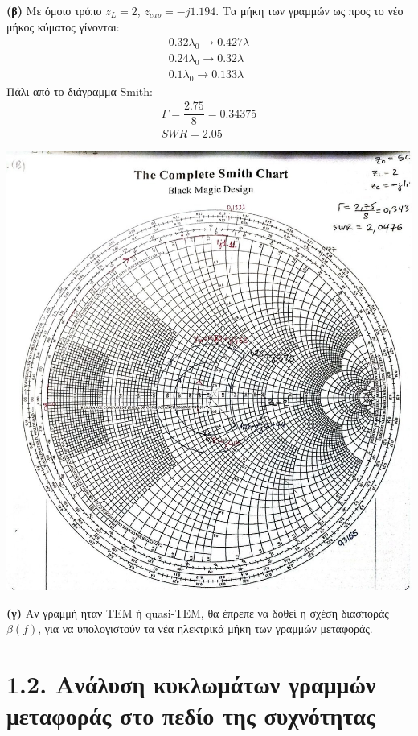 \documentclass[12pt]{article}
\begin{document}
\newpage
\textbf{(β)} Με όμοιο τρόπο \(z_L = 2\), \(z_{cap} = -j1.194\). Τα μήκη των γραμμών ως προς το νέο μήκος κύματος γίνονται: 
\begin{gather*}
    0.32\lambda_0 \rightarrow 0.427\lambda \\
    0.24\lambda_0 \rightarrow 0.32\lambda \\ 
    0.1\lambda_0 \rightarrow 0.133\lambda
\end{gather*}
Πάλι από το διάγραμμα Smith: 
\begin{gather*}
    \Gamma = \dfrac{2.75}{8} = 0.34375 \\ 
    SWR = 2.05
\end{gather*}
\begin{center}
    \includegraphics*[scale=0.5]{1-1-b.jpg}
\end{center}

\textbf{(γ)} Αν γραμμή ήταν ΤΕΜ ή quasi-TEM, θα έπρεπε να δοθεί η σχέση διασποράς \(\beta(f)\), για να υπολογιστούν τα νέα ηλεκτρικά μήκη των γραμμών μεταφοράς. 

\newpage
\section*{1.2. Ανάλυση κυκλωμάτων γραμμών μεταφοράς στο πεδίο της συχνότητας}
\end{document}
